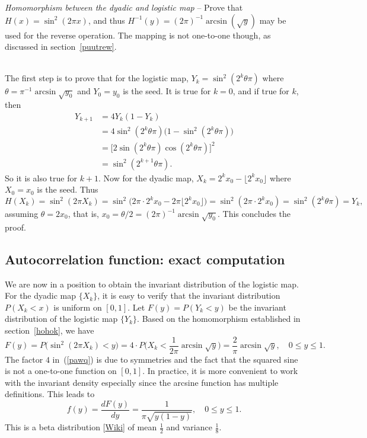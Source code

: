 \documentclass[oneside,10pt]{book}
\newcommand{\qed}{\nobreak \ifvmode \relax \else
      \ifdim\lastskip<1.5em \hskip-\lastskip
      \hskip1.5em plus0em minus0.5em \fi \nobreak
      \vrule height0.75em width0.5em depth0.25em\fi}
\begin{document}
\begin{Exercise}\label{exlm3} {\em Homomorphism between the dyadic and logistic map} -- Prove that  $H(x) =  \sin^2(2\pi x)$, and thus $H^{-1}(y) = (2 \pi)^{-1}\arcsin(\sqrt{y})$ may be used for the reverse operation. The mapping
 is not one-to-one though, as discussed in section~\ref{puutrew}.
\vspace{1ex}

 \\
The first step is to prove that for the logistic map, $Y_k=\sin^2(2^k\theta\pi)$ where $\theta= \pi^{-1}\arcsin\sqrt{y_0}$
and $Y_0=y_0$ is the seed. It is true for $k=0$, and if true for $k$, then
\begin{align}
Y_{k+1} & = 4Y_{k}(1-Y_{k})  \nonumber \\
      & = 4 \sin^2(2^{k}\theta\pi)\Big(1 - \sin^2(2^{k}\theta\pi)\Big) \nonumber \\
      & =  \Big[2\sin(2^k\theta\pi)\cos(2^k\theta\pi)\Big]^2 \nonumber \\
     & = \sin^2(2^{k+1}\theta\pi). \nonumber
\end{align}
So it is also true for $k+1$. Now for the dyadic map,
$X_k = 2^k x_0 - \lfloor 2^k x_0\rfloor$ where $X_0=x_0$ is the seed. Thus
$$H(X_k)=\sin^2(2\pi X_k)=\sin^2\Big(2\pi\cdot  2^k x_0 -2\pi\lfloor 2^k x_0\rfloor\Big) = \sin^2(2\pi \cdot 2^k x_0)=\sin^2(2^k\theta\pi) = Y_k,
$$
assuming $\theta=2x_0$,  that is,  $x_0 = \theta/2 = (2\pi)^{-1}\arcsin\sqrt{y_0}$. This concludes the proof. \qed
\end{Exercise}


\subsection{Autocorrelation function: exact computation}\label{cxcdsojhg}


We are now in a position to obtain the invariant distribution of the logistic map. For the dyadic map $\{X_k\}$, it is easy to verify that the
 invariant distribution $P(X_k < x)$ is uniform on $[0,1]$. Let $F(y) = P(Y_k <y)$ be the invariant
 distribution of the logistic map $\{Y_k\}$. Based on the homomorphism established in section~\ref{hohok}, we have
\begin{equation}
F(y)  = P\Big(\sin^2(2\pi X_k) < y\Big) = 4 \cdot P\Big(X_k< \frac{1}{2\pi}\arcsin\sqrt{y}\Big)
 = \frac{2}{\pi}\arcsin\sqrt{y}, \quad 0\leq y \leq 1.\label{pawq}
\end{equation}
The factor $4$ in~(\ref{pawq}) is due to symmetries and the fact that the squared sine is not
 a one-to-one function on $[0, 1]$. In practice, it is more convenient to work with
the invariant density especially since the arcsine function has multiple definitions. This leads to
\begin{equation}
f(y)=\frac{dF(y)}{dy} = \frac{1}{\pi \sqrt{y(1-y)}}, \quad 0\leq y \leq 1.  \label{logdfs}
\end{equation}
This is a \textcolor{index}{beta distribution} [\href{https://en.wikipedia.org/wiki/Beta_distribution}{Wiki}] of mean $\frac{1}{2}$ and variance $\frac{1}{8}$.
\end{document}
